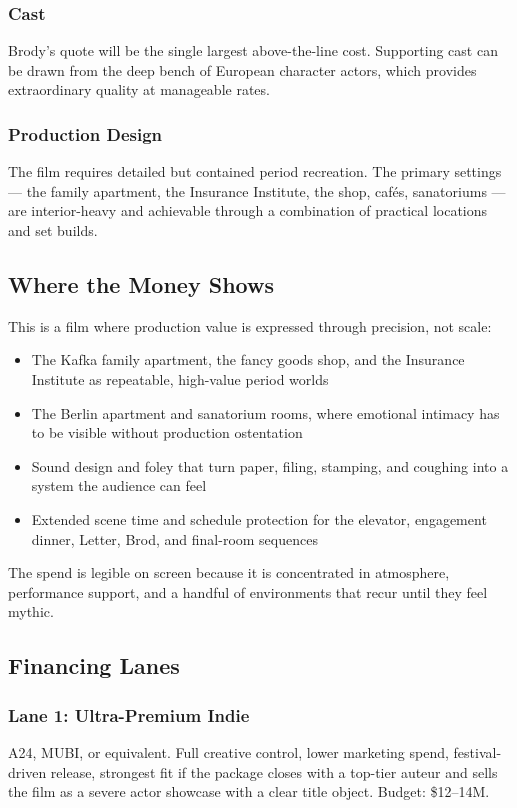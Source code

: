 \subsubsection{Cast}
Brody's quote will be the single largest above-the-line cost. Supporting cast can be drawn from the deep bench of European character actors, which provides extraordinary quality at manageable rates.

\subsubsection{Production Design}
The film requires detailed but contained period recreation. The primary settings --- the family apartment, the Insurance Institute, the shop, cafés, sanatoriums --- are interior-heavy and achievable through a combination of practical locations and set builds.

\subsection{Where the Money Shows}

This is a film where production value is expressed through precision, not scale:
\begin{itemize}[leftmargin=*]
\item The Kafka family apartment, the fancy goods shop, and the Insurance Institute as repeatable, high-value period worlds
\item The Berlin apartment and sanatorium rooms, where emotional intimacy has to be visible without production ostentation
\item Sound design and foley that turn paper, filing, stamping, and coughing into a system the audience can feel
\item Extended scene time and schedule protection for the elevator, engagement dinner, Letter, Brod, and final-room sequences
\end{itemize}

The spend is legible on screen because it is concentrated in atmosphere, performance support, and a handful of environments that recur until they feel mythic.

\subsection{Financing Lanes}

\subsubsection{Lane 1: Ultra-Premium Indie}
A24, MUBI, or equivalent. Full creative control, lower marketing spend, festival-driven release, strongest fit if the package closes with a top-tier auteur and sells the film as a severe actor showcase with a clear title object. Budget: \$12--14M.

